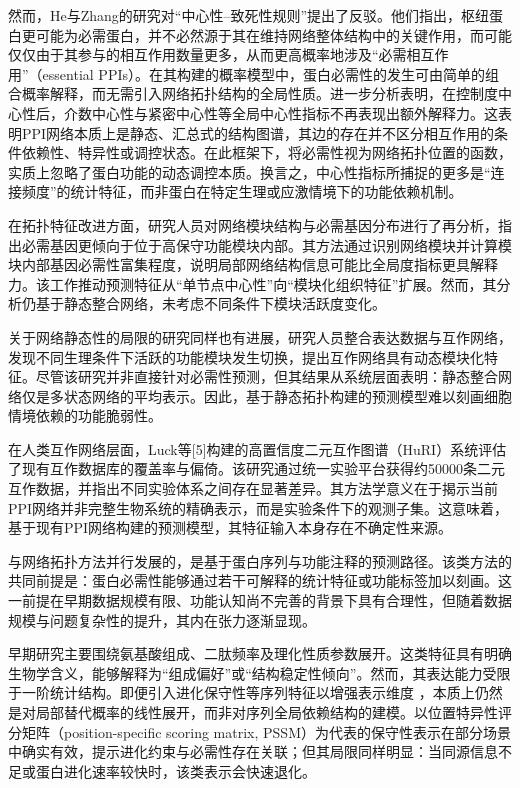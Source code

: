 然而，He与Zhang\cite{he2006why}的研究对“中心性–致死性规则”提出了反驳。他们指出，枢纽蛋白更可能为必需蛋白，并不必然源于其在维持网络整体结构中的关键作用，而可能仅仅由于其参与的相互作用数量更多，从而更高概率地涉及“必需相互作用”（essential PPIs）。在其构建的概率模型中，蛋白必需性的发生可由简单的组合概率解释，而无需引入网络拓扑结构的全局性质。进一步分析表明，在控制度中心性后，介数中心性与紧密中心性等全局中心性指标不再表现出额外解释力。这表明PPI网络本质上是静态、汇总式的结构图谱，其边的存在并不区分相互作用的条件依赖性、特异性或调控状态。在此框架下，将必需性视为网络拓扑位置的函数，实质上忽略了蛋白功能的动态调控本质。换言之，中心性指标所捕捉的更多是“连接频度”的统计特征，而非蛋白在特定生理或应激情境下的功能依赖机制。

在拓扑特征改进方面，研究人员对网络模块结构与必需基因分布进行了再分析，指出必需基因更倾向于位于高保守功能模块内部\cite{yu2008genomic}。其方法通过识别网络模块并计算模块内部基因必需性富集程度，说明局部网络结构信息可能比全局度指标更具解释力。该工作推动预测特征从“单节点中心性”向“模块化组织特征”扩展。然而，其分析仍基于静态整合网络，未考虑不同条件下模块活跃度变化。

关于网络静态性的局限的研究同样也有进展，研究人员整合表达数据与互作网络，发现不同生理条件下活跃的功能模块发生切换，提出互作网络具有动态模块化特征\cite{han2004evidence}。尽管该研究并非直接针对必需性预测，但其结果从系统层面表明：静态整合网络仅是多状态网络的平均表示。因此，基于静态拓扑构建的预测模型难以刻画细胞情境依赖的功能脆弱性。

在人类互作网络层面，Luck等[5]构建的高置信度二元互作图谱（HuRI）系统评估了现有互作数据库的覆盖率与偏倚\cite{luck2020reference}。该研究通过统一实验平台获得约50000条二元互作数据，并指出不同实验体系之间存在显著差异。其方法学意义在于揭示当前PPI网络并非完整生物系统的精确表示，而是实验条件下的观测子集。这意味着，基于现有PPI网络构建的预测模型，其特征输入本身存在不确定性来源。

与网络拓扑方法并行发展的，是基于蛋白序列与功能注释的预测路径。该类方法的共同前提是：蛋白必需性能够通过若干可解释的统计特征或功能标签加以刻画。这一前提在早期数据规模有限、功能认知尚不完善的背景下具有合理性，但随着数据规模与问题复杂性的提升，其内在张力逐渐显现。

早期研究主要围绕氨基酸组成、二肽频率及理化性质参数展开。这类特征具有明确生物学含义，能够解释为“组成偏好”或“结构稳定性倾向”。然而，其表达能力受限于一阶统计结构。即便引入进化保守性等序列特征以增强表示维度 \cite{deng2011investigating}，本质上仍然是对局部替代概率的线性展开，而非对序列全局依赖结构的建模。以位置特异性评分矩阵（position-specific scoring matrix, PSSM）为代表的保守性表示在部分场景中确实有效，提示进化约束与必需性存在关联；但其局限同样明显：当同源信息不足或蛋白进化速率较快时，该类表示会快速退化。

